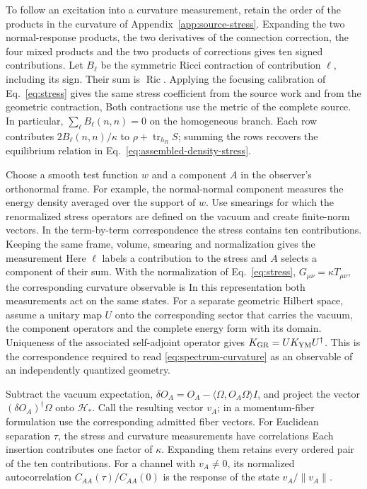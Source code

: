 To follow an excitation into a curvature measurement, retain the order of the products in the curvature of Appendix~\ref{app:source-stress}. Expanding the two normal-response products, the two derivatives of the connection correction, the four mixed products and the two products of corrections gives ten signed contributions. Let \(B_\ell\) be the symmetric Ricci contraction of contribution \(\ell\), including its sign. Their sum is \(\operatorname{Ric}\). Applying the focusing calibration of Eq.~\eqref{eq:stress} gives the same stress coefficient from the source work and from the geometric contraction,
\SpectrumRowStressDisplay
Both contractions use the metric of the complete source. In particular, \(\sum_\ell B_\ell(n,n)=0\) on the homogeneous branch. Each row contributes \(2B_\ell(n,n)/\kappa\) to \(\rho+\operatorname{tr}_{h_R}S\); summing the rows recovers the equilibrium relation in Eq.~\eqref{eq:assembled-density-stress}.

Choose a smooth test function \(w\) and a component \(A\) in the observer's orthonormal frame. For example, the normal-normal component measures the energy density averaged over the support of \(w\). Use smearings for which the renormalized stress operators are defined on the vacuum and create finite-norm vectors. In the term-by-term correspondence the stress contains ten contributions. Keeping the same frame, volume, smearing and normalization gives the measurement
\SpectrumComponentDisplay
Here \(\ell\) labels a contribution to the stress and \(A\) selects a component of their sum. With the normalization of Eq.~\eqref{eq:stress}, \(G_{\mu\nu}=\kappa T_{\mu\nu}\), the corresponding curvature observable is
\SpectrumCurvatureDisplay
In this representation both measurements act on the same states. For a separate geometric Hilbert space, assume a unitary map \(U\) onto the corresponding sector that carries the vacuum, the component operators and the complete energy form with its domain. Uniqueness of the associated self-adjoint operator gives \(K_{\rm GR}=U K_{\rm YM}U^\dagger\). This is the correspondence required to read \eqref{eq:spectrum-curvature} as an observable of an independently quantized geometry.

Subtract the vacuum expectation, \(\delta O_A=O_A-\langle\Omega,O_A\Omega\rangle I\), and project the vector \((\delta O_A)^\dagger\Omega\) onto \(\mathcal H_*\). Call the resulting vector \(v_A\); in a momentum-fiber formulation use the corresponding admitted fiber vectors. For Euclidean separation \(\tau\), the stress and curvature measurements have correlations
\SpectrumCorrelationsDisplay
Each insertion contributes one factor of \(\kappa\). Expanding them retains every ordered pair of the ten contributions. For a channel with \(v_A\ne0\), its normalized autocorrelation \(C_{AA}(\tau)/C_{AA}(0)\) is the response of the state \(v_A/\|v_A\|\).

